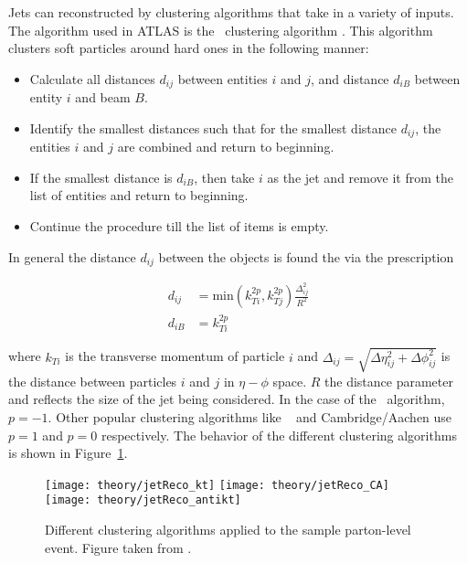 
Jets can reconstructed by clustering algorithms that take in a variety of inputs.
The algorithm used in ATLAS is the \antikt\ clustering algorithm \cite{Cacciari:2008gp}.
This algorithm clusters soft particles around hard ones in the following manner:

\begin{itemize}
\item Calculate all distances $d_{ij}$ between entities $i$ and $j$, and distance $d_{iB}$ between entity $i$ and beam $B$.
\item Identify the smallest distances such that for the smallest distance $d_{ij}$, the entities $i$ and $j$ are combined and return to beginning.
\item If the smallest distance is $d_{iB}$, then take $i$ as the jet and remove it from the list of entities and return to beginning.
\item Continue the procedure till the list of items is empty.
\end{itemize}

In general the distance $d_{ij}$ between the objects is found the via the prescription

\begin{align}
d_{ij} &= \mathrm{min} (k_{Ti}^{2p} , k_{Tj}^{2p}) \frac{\Delta_{ij}^2}{R^2}  \\
d_{iB} &= k_{Ti}^{2p}
\end{align}

where $k_{Ti}$ is the transverse momentum of particle $i$ and $\Delta_{ij} = \sqrt{\Delta\eta_{ij}^2 + \Delta\phi_{ij}^2}$ is the distance between particles $i$ and $j$ in $\eta-\phi$ space.
$R$ the distance parameter and reflects the size of the jet being considered.
In the case of the \antikt\ algorithm, $p = -1$.
Other popular clustering algorithms like \kt\ \cite{Catani:1993hr} and Cambridge/Aachen \cite{Dokshitzer:1997in} use $p = 1$ and $p=0$ respectively.
The behavior of the different clustering algorithms is shown in Figure~\ref{fig:JetClustering}.


\begin{figure}[htp]
\centering
\texttt{[image: theory/jetReco\_kt]}\hfill
\texttt{[image: theory/jetReco\_CA]}\hfill
\texttt{[image: theory/jetReco\_antikt]}\hfill
\caption{Different clustering algorithms applied to the sample parton-level event.
Figure taken from \cite{Cacciari:2008gp}.}
\label{fig:JetClustering}
\end{figure}

